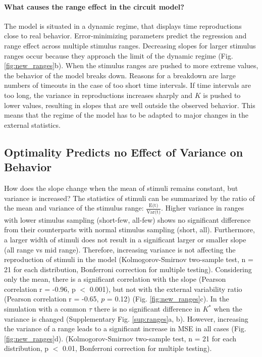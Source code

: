 \documentclass[10pt]{article}
\begin{document}
\paragraph{What causes the range effect in the circuit model?} 
The model is situated in a dynamic regime, that displays time reproductions close to real behavior.
Error-minimizing parameters predict the regression and range effect across multiple stimulus ranges.
Decreasing slopes for larger stimulus ranges occur because they approach the limit of the dynamic regime (Fig. \ref{fig:new_ranges}b).
When the stimulus ranges are pushed to more extreme values, the behavior of the model breaks down. Reasons for a breakdown are large numbers of timeouts in the case of too short time intervals. If time intervals are too long, the variance in reproductions increases sharply and $K$ is pushed to lower values, resulting in slopes that are well outside the observed behavior. 
This means that the regime of the model has to be adapted to major changes in the external statistics. 

\subsection{Optimality Predicts no Effect of Variance on Behavior}
How does the slope change when the mean of stimuli remains constant, but variance is increased?
The statistics of stimuli can be summarized by the ratio of the mean and variance of the stimulus range: $\frac{\text{E(t)}}{\text{Var(t)}}$.
Higher variance in ranges with lower stimulus sampling (short-few, all-few) shows no significant difference from their counterparts with normal stimulus sampling (short, all).
Furthermore, a larger width of stimuli does not result in a significant larger or smaller slope (all range vs mid range).
Therefore, increasing variance is not affecting the reproduction of stimuli in the model (Kolmogorov-Smirnov two-sample test, n = 21 for each distribution, Bonferroni correction for multiple testing).
Considering only the mean, there is a significant correlation with the slope (Pearson correlation r = -0.96, p $<$ 0.001), but not with the external variability ratio (Pearson correlation r = -0.65, $p$ = 0.12) (Fig. \ref{fig:new_ranges}c).
In the simulation with a common $\tau$ there is no significant difference in $K^*$ when the variance is changed (Supplementary Fig. \ref{sup:ranges}a, b).
However, increasing the variance of a range leads to a significant increase in MSE in all cases (Fig. \ref{fig:new_ranges}d).  
(Kolmogorov-Smirnov two-sample test, n = 21 for each distribution, p $<$ 0.01, Bonferroni correction for multiple testing).
\end{document}
